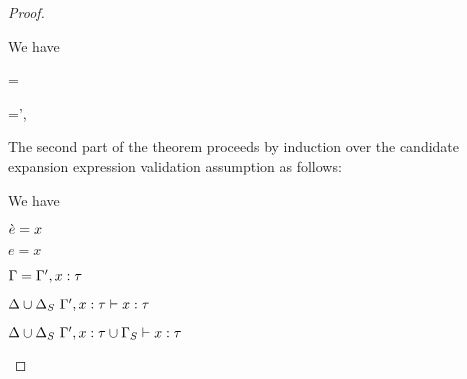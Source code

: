 \begin{proof}
\begin{byCases}
\item[\text{(\ref{rule:expandsU-tsmap})}] We have 
\begin{pfsteps}
  \item \ue= 
  \item \Sigma=\Sigma',  
  \item {} 
  \item {} 
  \item \decodeCondE{\ecand}{\ce} 
  \item {} 
  \item \uetsmenv{\Delta}{\Sigma}  
  \item {} 
\end{pfsteps}
\resetpfcounter
\end{byCases}

The second part of the theorem proceeds by induction over the candidate expansion expression validation assumption as follows:
\begin{byCases}
\item[\text{(\ref{rule:cvalidE-U-var})}] We have
\begin{pfsteps*}
  \item $\grave{e}=x$ 
  \item $e=x$ 
  \item $\Gamma=\Gamma', x : \tau$ 
  \item ${\Delta}\cup{\Delta_S}~\Gamma', x : \tau \vdash x : \tau$  
  \item ${\Delta}\cup{\Delta_S}~{\Gamma', x : \tau}\cup{\Gamma_S} \vdash x : \tau$ 
\end{pfsteps*}
\resetpfcounter


\end{byCases}
\end{proof}
